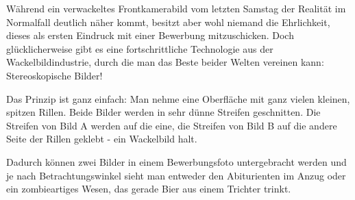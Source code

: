 \documentclass[a5paper,pagesize,10pt,bibtotoc,pointlessnumbers,normalheadings,DIV=9,twoside=false]{scrbook}
\begin{document}
Während ein verwackeltes Frontkamerabild vom letzten Samstag der Realität im Normalfall deutlich näher kommt, besitzt aber wohl niemand die Ehrlichkeit, dieses als ersten Eindruck mit einer Bewerbung mitzuschicken.
Doch glücklicherweise gibt es eine fortschrittliche Technologie aus der Wackelbildindustrie, durch die man das Beste beider Welten vereinen kann:
Stereoskopische Bilder!

Das Prinzip ist ganz einfach:
Man nehme eine Oberfläche mit ganz vielen kleinen, spitzen Rillen.
Beide Bilder werden in sehr dünne Streifen geschnitten.
Die Streifen von Bild A werden auf die eine, die Streifen von Bild B auf die andere Seite der Rillen geklebt - ein Wackelbild halt.

Dadurch können zwei Bilder in einem Bewerbungsfoto untergebracht werden und je nach Betrachtungswinkel sieht man entweder den Abiturienten im Anzug oder ein zombieartiges Wesen, das gerade Bier aus einem Trichter trinkt.



\end{document}

